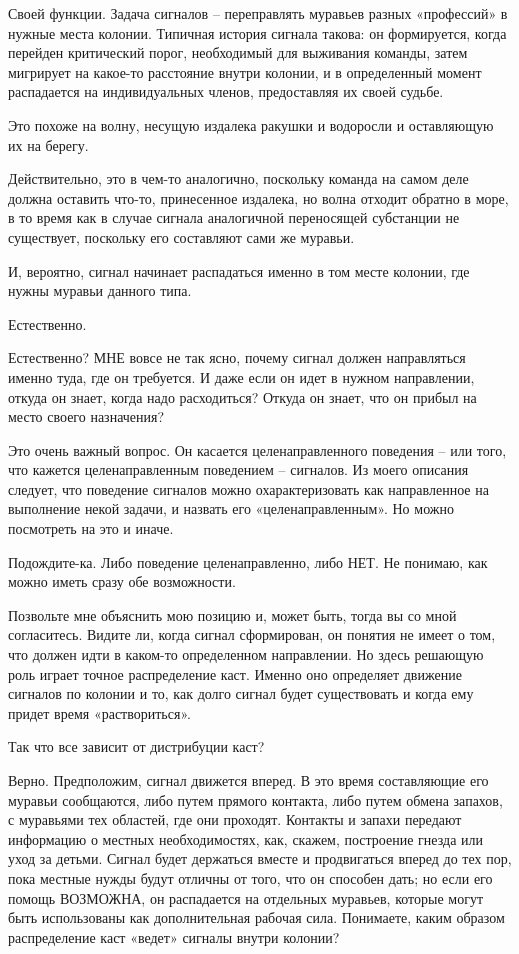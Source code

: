 \documentclass[../main.tex]{subfiles}
\begin{document}
\begin{dialogue}
 Своей функции. Задача сигналов \--- переправлять муравьев разных «профессий» в нужные места колонии. Типичная история сигнала такова: он формируется, когда перейден критический порог, необходимый для выживания команды, затем мигрирует на какое-то расстояние внутри колонии, и в определенный момент распадается на индивидуальных членов, предоставляя их своей судьбе.

 Это похоже на волну, несущую издалека ракушки и водоросли и оставляющую их на берегу.

 Действительно, это в чем-то аналогично, поскольку команда на самом деле должна оставить что-то, принесенное издалека, но волна отходит обратно в море, в то время как в случае сигнала аналогичной переносящей субстанции не существует, поскольку его составляют сами же муравьи.

 И, вероятно, сигнал начинает распадаться именно в том месте колонии, где нужны муравьи данного типа.

 Естественно.

 Естественно? МНЕ вовсе не так ясно, почему сигнал должен направляться именно туда, где он требуется. И даже если он идет в нужном направлении, откуда он знает, когда надо расходиться? Откуда он знает, что он прибыл на место своего назначения?

 Это очень важный вопрос. Он касается целенаправленного поведения \--- или того, что кажется целенаправленным поведением \--- сигналов. Из моего описания следует, что поведение сигналов можно охарактеризовать как направленное на выполнение некой задачи, и назвать его «целенаправленным». Но можно посмотреть на это и иначе.

 Подождите-ка. Либо поведение целенаправленно, либо НЕТ. Не понимаю, как можно иметь сразу обе возможности.

 Позвольте мне объяснить мою позицию и, может быть, тогда вы со мной согласитесь. Видите ли, когда сигнал сформирован, он понятия не имеет о том, что должен идти в каком-то определенном направлении. Но здесь решающую роль играет точное распределение каст. Именно оно определяет движение сигналов по колонии и то, как долго сигнал будет существовать и когда ему придет время «раствориться».

 Так что все зависит от дистрибуции каст?

 Верно. Предположим, сигнал движется вперед. В это время составляющие его муравьи сообщаются, либо путем прямого контакта, либо путем обмена запахов, с муравьями тех областей, где они проходят. Контакты и запахи передают информацию о местных необходимостях, как, скажем, построение гнезда или уход за детьми. Сигнал будет держаться вместе и продвигаться вперед до тех пор, пока местные нужды будут отличны от того, что он способен дать; но если его помощь ВОЗМОЖНА, он распадается на отдельных муравьев, которые могут быть использованы как дополнительная рабочая сила. Понимаете, каким образом распределение каст «ведет» сигналы внутри колонии?


\end{dialogue}
\end{document}
